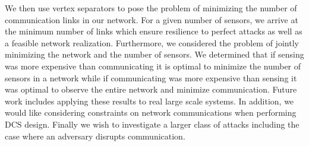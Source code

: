 \documentclass[letterpaper, 10 pt, conference]{ieeeconf}
\begin{document}
We then use vertex separators to pose the problem of minimizing the number of communication links in our network. For a given number of sensors, we arrive at the minimum number of links which ensure resilience to perfect attacks as well as a feasible network realization. Furthermore, we considered the problem of jointly minimizing the network and the number of sensors. We determined that if sensing was more expensive than communicating it is optimal to minimize the number of sensors in a network while if communicating was more expensive than sensing it was optimal to observe the entire network and minimize communication. Future work includes applying these results to real large scale systems. In addition, we would like considering constraints on network communications when performing DCS design.  Finally we wish to investigate a larger class of attacks including the case where an adversary disrupts communication.




\end{document}
